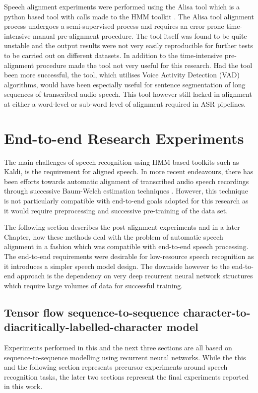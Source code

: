 Speech alignment experiments were performed using the Alisa \cite{stan2016alisa} tool which is a python based tool with calls made to the HMM toolkit \cite{young2002htk}.  The Alisa tool alignment process undergoes a semi-supervised process and requires an error prone time-intensive manual pre-alignment procedure.  The tool itself was found to be quite unstable and the output results were not very easily reproducible for further tests to be carried out on different datasets.  In addition to the time-intensive pre-alignment procedure made the tool not very useful for this research. Had the tool been more successful, the tool, which utilises Voice Activity Detection (VAD) algorithms, would have been especially useful for sentence segmentation of long sequences of transcribed audio speech.  This tool however still lacked in alignment at either a word-level or sub-word level of alignment required in ASR pipelines.


\section{End-to-end Research Experiments}\label{sec_postalign}
The main challenges of speech recognition using HMM-based toolkits such as Kaldi, is the requirement for aligned speech.  In more recent endeavours, there has been efforts towards automatic alignment of transcribed audio speech recordings through successive Baum-Welch estimation techniques \cite{gales2014speech,ragni2018automatic,ragni2014data}. However, this technique is not particularly compatible with end-to-end goals adopted for this research as it would require preprocessing and successive pre-training of the data set.

The following section describes the post-alignment experiments and in a later Chapter, how these methods deal with the problem of automatic speech alignment in a fashion which was compatible with end-to-end speech processing.  The end-to-end requirements were desirable for low-resource speech recognition as it introduces a simpler speech model design.  The downside however to the end-to-end approach is the dependency on very deep recurrent neural network structures which require large volumes of data for successful training.
\subsection{Tensor flow sequence-to-sequence character-to-diacritically-labelled-character model}\label{sec_c2d}
Experiments performed in this and the next three sections are all based on sequence-to-sequence modelling using recurrent neural networks. While the this and the following section represents precursor experiments around speech recognition tasks, the later two sections represent the final experiments reported in this work.

